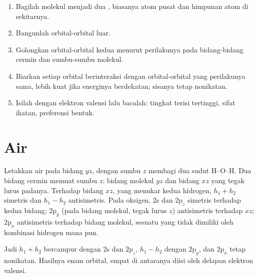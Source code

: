 \begin{method}\label{met:b2:fragment-orbitals:fragment-diagram}
\begin{enumerate}
  \item Bagilah molekul menjadi dua , biasanya atom pusat dan
        himpunan atom di sekitarnya.
  \item Bangunlah  orbital-orbital luar.
  \item Golongkan orbital-orbital kedua  menurut perilakunya pada
        bidang-bidang cermin dan sumbu-sumbu molekul.
  \item Biarkan setiap orbital berinteraksi dengan orbital-orbital yang
        perilakunya sama, lebih kuat jika energinya berdekatan; sisanya
        tetap nonikatan.
  \item Isilah dengan elektron valensi lalu bacalah: tingkat terisi
        tertinggi, sifat ikatan, preferensi bentuk.
\end{enumerate}
\end{method}

\section{Air}

Letakkan air pada bidang $yz$, dengan sumbu $z$ membagi dua sudut H--O--H.
Dua bidang cermin memuat sumbu $z$: bidang molekul $yz$ dan bidang $xz$ yang
tegak lurus padanya. Terhadap bidang $xz$, yang menukar kedua hidrogen,
$h_1 + h_2$ simetris dan $h_1 - h_2$ antisimetris. Pada oksigen, 2s dan
$2\mathrm p_z$ simetris terhadap kedua bidang; $2\mathrm p_y$ (pada bidang
molekul, tegak lurus $z$) antisimetris terhadap $xz$; $2\mathrm p_x$
antisimetris terhadap bidang molekul, sesuatu yang tidak dimiliki oleh
kombinasi hidrogen mana pun.

Jadi $h_1 + h_2$ bercampur dengan 2s dan $2\mathrm p_z$, $h_1 - h_2$ dengan
$2\mathrm p_y$, dan $2\mathrm p_x$ tetap nonikatan. Hasilnya enam orbital,
empat di antaranya diisi oleh delapan elektron valensi.

